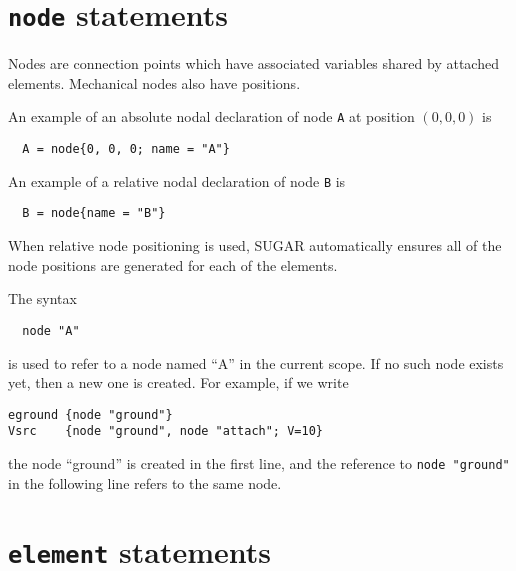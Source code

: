 \section{\texttt{node} statements}


Nodes are connection points which have associated variables shared
by attached elements.  Mechanical nodes also have positions.

An example of an absolute nodal declaration of node \texttt{A} at position 
$(0, 0, 0)$ is
\begin{verbatim}
  A = node{0, 0, 0; name = "A"}
\end{verbatim}

An example of a relative nodal declaration of node \texttt{B} is
\begin{verbatim}
  B = node{name = "B"}
\end{verbatim}
When relative node positioning is used, SUGAR automatically ensures 
all of the node positions are generated for each of the elements.

The syntax
\begin{verbatim}
  node "A"
\end{verbatim}
is used to refer to a node named ``A'' in the current scope.
If no such node exists yet, then a new one is created.  For example,
if we write
\begin{verbatim}
eground {node "ground"}
Vsrc    {node "ground", node "attach"; V=10}
\end{verbatim}
the node ``ground'' is created in the first line, and the reference to
\verb|node "ground"| in the following line refers to the same node.


\section{\texttt{element} statements}

